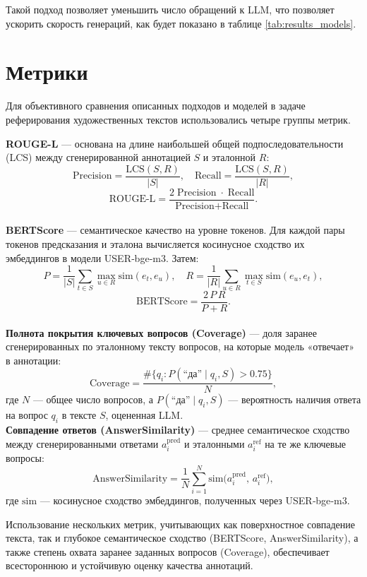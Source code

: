 \documentclass{article}
\begin{document}
Такой подход позволяет уменьшить число обращений к LLM, что позволяет ускорить скорость генераций, как будет показано в таблице \ref{tab:results_models}.


\section*{Метрики}

Для объективного сравнения описанных подходов и моделей в задаче реферирования художественных текстов использовались четыре группы метрик.

\textbf{ROUGE-L} — основана на длине наибольшей общей подпоследовательности (LCS) между сгенерированной аннотацией $S$ и эталонной $R$:
    \[
      \text{Precision} = \frac{\mathrm{LCS}(S,R)}{|S|},\quad
      \text{Recall} = \frac{\mathrm{LCS}(S,R)}{|R|},
    \]
    \[
      \text{ROUGE‑L} = \frac{2\;\text{Precision}\;\cdot\;\text{Recall}}{\text{Precision} + \text{Recall}}.
    \]
\\ \textbf{BERTScore} — семантическое качество на уровне токенов. Для каждой пары токенов предсказания и эталона вычисляется косинусное сходство их эмбеддингов в модели USER‑bge‑m3. Затем:
    \[
      P = \frac{1}{|S|}\sum_{t\in S}\max_{u\in R}\!\mathrm{sim}(e_t, e_u),\quad
      R = \frac{1}{|R|}\sum_{u\in R}\max_{t\in S}\!\mathrm{sim}(e_u, e_t),
    \]
    \[
      \text{BERTScore} = \frac{2\,P\,R}{P+R}.
    \]
\\ \textbf{Полнота покрытия ключевых вопросов (Coverage)} — доля заранее сгенерированных по эталонному тексту вопросов, на которые модель «отвечает» в аннотации:
    \[
      \text{Coverage} = \frac{\#\{q_i\colon P(\text{“да”}\mid q_i,S)\!>\!0.75\}}{N},
    \]
    где $N$ — общее число вопросов, а $P(\text{“да”}\mid q_i,S)$ — вероятность наличия ответа на вопрос $q_i$ в тексте $S$, оцененная LLM.
\\ \textbf{Совпадение ответов (AnswerSimilarity)} — среднее семантическое сходство между сгенерированными ответами $a_i^{\text{pred}}$ и эталонными $a_i^{\text{ref}}$ на те же ключевые вопросы:
    \[
      \text{AnswerSimilarity}
      = \frac{1}{N}\sum_{i=1}^N \mathrm{sim}\bigl(a_i^{\text{pred}},\,a_i^{\text{ref}}\bigr),
    \]
    где $\mathrm{sim}$ — косинусное сходство эмбеддингов, полученных через USER‑bge‑m3.


Использование нескольких метрик, учитывающих как поверхностное совпадение текста, так и глубокое семантическое сходство (BERTScore, AnswerSimilarity), а также степень охвата заранее заданных вопросов (Coverage), обеспечивает всестороннюю и устойчивую оценку качества аннотаций.
\end{document}
